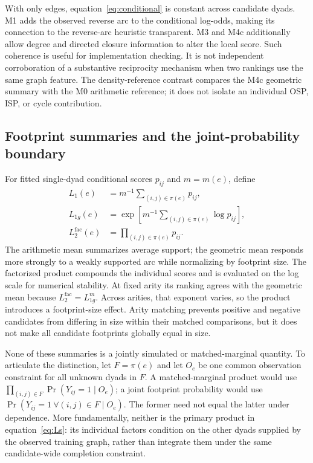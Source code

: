 \documentclass[10pt]{article}
\begin{document}
With only edges, equation~\eqref{eq:conditional} is constant across candidate dyads. M1 adds the observed reverse arc to the conditional log-odds, making its connection to the reverse-arc heuristic transparent. M3 and M4c additionally allow degree and directed closure information to alter the local score. Such coherence is useful for implementation checking. It is not independent corroboration of a substantive reciprocity mechanism when two rankings use the same graph feature. The density-reference contrast compares the M4c geometric summary with the M0 arithmetic reference; it does not isolate an individual OSP, ISP, or cycle contribution.

\subsection{Footprint summaries and the joint-probability boundary}
For fitted single-dyad conditional scores $p_{ij}$ and $m=m(e)$, define
\begin{align}
L_1(e)&=m^{-1}\sum_{(i,j)\in\pi(e)}p_{ij},\\
L_{1g}(e)&=\exp\left[m^{-1}\sum_{(i,j)\in\pi(e)}\log p_{ij}\right],\\
L_2^{\mathrm{fac}}(e)&=\prod_{(i,j)\in\pi(e)}p_{ij}.
\label{eq:Ls}
\end{align}
The arithmetic mean summarizes average support; the geometric mean responds more strongly to a weakly supported arc while normalizing by footprint size. The factorized product compounds the individual scores and is evaluated on the log scale for numerical stability. At fixed arity its ranking agrees with the geometric mean because $L_2^{\mathrm{fac}}=L_{1g}^{m}$. Across arities, that exponent varies, so the product introduces a footprint-size effect. Arity matching prevents positive and negative candidates from differing in size within their matched comparisons, but it does not make all candidate footprints globally equal in size.

None of these summaries is a jointly simulated or matched-marginal quantity. To articulate the distinction, let $F=\pi(e)$ and let $O_e$ be one common observation constraint for all unknown dyads in $F$. A matched-marginal product would use $\prod_{(i,j)\in F}\Pr(Y_{ij}=1\mid O_e)$; a joint footprint probability would use $\Pr(Y_{ij}=1\ \forall(i,j)\in F\mid O_e)$. The former need not equal the latter under dependence. More fundamentally, neither is the primary product in equation~\eqref{eq:Ls}: its individual factors condition on the other dyads supplied by the observed training graph, rather than integrate them under the same candidate-wide completion constraint.
\end{document}

